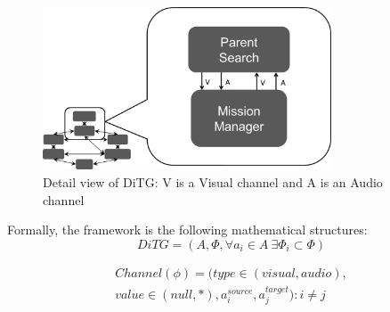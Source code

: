 \begin{figure}
\center
\setlength{\abovecaptionskip}{1mm}
\setlength{\belowcaptionskip}{1mm}
\setlength{\textfloatsep}{1mm}
\setlength{\floatsep}{1mm}
\includegraphics[height=1.9in]{ditg_detailed.png}
\caption{Detail view of DiTG: V is a Visual channel and A is an Audio channel}
\label{fig:ditg_detail}
\end{figure}

Formally, the framework is the following mathematical structures:
 \begin{equation}
 	DiTG = (A, \Phi, \forall a_i \in A~ \exists \Phi_i \subset \Phi)
 \end{equation}

%
%

\begin{equation}
\begin{split}
Channel (\phi) = (type \in (visual, audio), \\
value \in (null, *), 
 a_i^{source}, a_j^{target}) : i \neq j
 \label{eq:channel}
 \end{split}
\end{equation}

